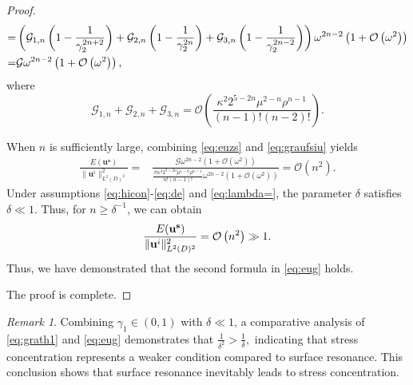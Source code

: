 \documentclass[11pt,reqno,twoside]{amsart}
\theoremstyle{definition}
\theoremstyle{remark}
\newtheorem{rem}{Remark}[section]
\numberwithin{equation}{section}
\newcommand{\bu}{\mathbf{u}}
\begin{document}
\begin{proof}
\begin{align}
					=&\left(\mathcal{G}_{1,n}\left(1-\frac{1}{\gamma_{2}^{2n+2}}\right)+\mathcal{G}_{2,n}\left(1-\frac{1}{\gamma_{2}^{2n}}\right)+\mathcal{G}_{3,n}\left(1-\frac{1}{\gamma_{2}^{2n-2}}\right)\right)\omega^{2n-2}\left(1+\mathcal{O}\left(\omega^2\right)\right)\notag\\
					=&\mathcal{G}\omega^{2n-2}\left(1+\mathcal{O}\left(\omega^2\right)\right),\notag
				\end{align}
				where
				\[\mathcal{G}_{1,n}+\mathcal{G}_{2,n}+\mathcal{G}_{3,n}=\mathcal{O}\left(\frac{  \kappa^2 2^{5-2 n}  \mu ^{2-n} \rho ^{n-1} }{ (n-1)!  (n-2)!}\right).\]
				
				When $n$ is sufficiently large, combining \eqref{eq:euzs} and \eqref{eq:graufsiu} yields
				\begin{align}\label{eq:eu2}
					\frac{E(\mathbf{u^{s}})}{\|\bu^i\|_{L^2(D)^2}^2}=&\frac{\mathcal{G}\omega ^{2n-2}(1+\mathcal{O}(\omega^2  ))}{\frac{\pi\kappa ^2 2^{3-2 n} \mu ^{1-n} \rho ^{n-1} }{n!(n-1)!} \omega^{2n-2}(1+\mathcal{O}(\omega^2  ))} =\mathcal{O}\left(n^2\right).
				\end{align}
				Under assumptions \eqref{eq:hicon}-\eqref{eq:de} and \eqref{eq:lambda=}, the  parameter $\delta$ satisfies $\delta\ll1$. Thus, for $n \geq \delta^{-1}$, we can obtain 
				\begin{displaymath}\notag  
					\frac{E(\mathbf{u^{s}})}{\|\bu^i\|_{L^2(D)^2}^2} = \mathcal{O}\left(n^2\right) \gg 1.  
				\end{displaymath} 
				Thus, we have demonstrated that the second formula in \eqref{eq:eug} holds.
				
				The proof is complete.
			\end{proof}
			\begin{rem}
				Combining \( \gamma_1 \in (0,1) \) with \( \delta \ll 1 \), a comparative analysis of \eqref{eq:grath1} and \eqref{eq:eug} demonstrates that
				\(
				\frac{1}{\delta^2} > \frac{1}{\delta},
				\)
				indicating that stress concentration represents a weaker condition compared to surface resonance. This conclusion shows that surface resonance inevitably leads to stress concentration.
			\end{rem}
			
\end{document}
